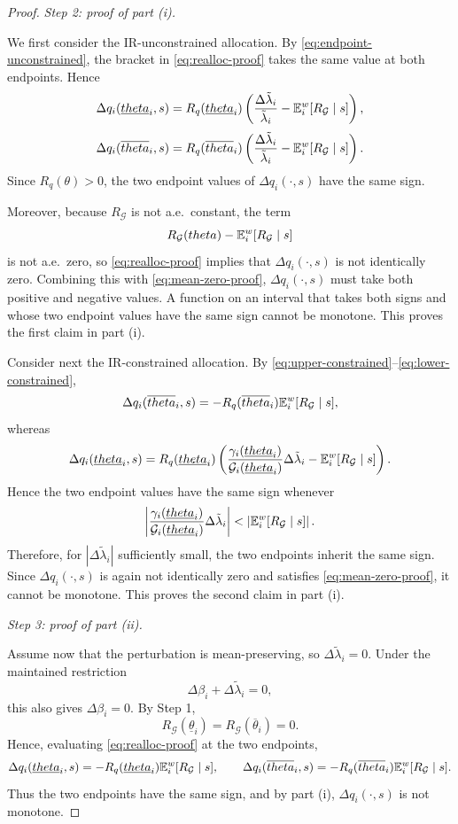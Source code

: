 \documentclass[master.tex]{subfiles}
\begin{document}
\begin{proof}
\noindent\textit{Step 2: proof of part (i).}

We first consider the IR-unconstrained allocation. By \eqref{eq:endpoint-unconstrained}, the bracket in \eqref{eq:realloc-proof} takes the same value at both endpoints. Hence
\[
\Delta q_i(\underline{theta}_i,s)
=
R_q(\underline{theta}_i)
\left(
\frac{\Delta\tilde\lambda_i}{\tilde\lambda_i}
-
\mathbb{E}_i^w[R_{\mathcal G}\mid s]
\right),
\]
\[
\Delta q_i(\overline{theta}_i,s)
=
R_q(\overline{theta}_i)
\left(
\frac{\Delta\tilde\lambda_i}{\tilde\lambda_i}
-
\mathbb{E}_i^w[R_{\mathcal G}\mid s]
\right).
\]
Since $R_q(\theta)>0$, the two endpoint values of $\Delta q_i(\cdot,s)$ have the same sign.

Moreover, because $R_{\mathcal G}$ is not a.e.\ constant, the term
\[
R_{\mathcal G}(theta)-\mathbb{E}_i^w[R_{\mathcal G}\mid s]
\]
is not a.e.\ zero, so \eqref{eq:realloc-proof} implies that $\Delta q_i(\cdot,s)$ is not identically zero. Combining this with \eqref{eq:mean-zero-proof}, $\Delta q_i(\cdot,s)$ must take both positive and negative values. A function on an interval that takes both signs and whose two endpoint values have the same sign cannot be monotone. This proves the first claim in part (i).

Consider next the IR-constrained allocation. By \eqref{eq:upper-constrained}--\eqref{eq:lower-constrained},
\[
\Delta q_i(\overline{theta}_i,s)
=
-
R_q(\overline{theta}_i)\mathbb{E}_i^w[R_{\mathcal G}\mid s],
\]
whereas
\[
\Delta q_i(\underline{theta}_i,s)
=
R_q(\underline{theta}_i)
\left(
\frac{\gamma_i(\underline{theta}_i)}{\mathcal G_i(\underline{theta}_i)}\Delta\tilde\lambda_i
-
\mathbb{E}_i^w[R_{\mathcal G}\mid s]
\right).
\]
Hence the two endpoint values have the same sign whenever
\[
\left|
\frac{\gamma_i(\underline{theta}_i)}{\mathcal G_i(\underline{theta}_i)}
\Delta\tilde\lambda_i
\right|
<
\left|
\mathbb{E}_i^w[R_{\mathcal G}\mid s]
\right|.
\]
Therefore, for $|\Delta\tilde\lambda_i|$ sufficiently small, the two endpoints inherit the same sign. Since $\Delta q_i(\cdot,s)$ is again not identically zero and satisfies \eqref{eq:mean-zero-proof}, it cannot be monotone. This proves the second claim in part (i).


\noindent\textit{Step 3: proof of part (ii).}

Assume now that the perturbation is mean-preserving, so $\Delta\tilde\lambda_i=0$. Under the maintained restriction
\[
\Delta\beta_i+\Delta\tilde\lambda_i=0,
\]
this also gives $\Delta\beta_i=0$. By Step 1,
\[
R_{\mathcal G}(\underline\theta_i)=R_{\mathcal G}(\overline\theta_i)=0.
\]
Hence, evaluating \eqref{eq:realloc-proof} at the two endpoints,
\begin{equation}\label{eq:endpoints-part-ii}
\Delta q_i(\underline{theta}_i,s)
=
-
R_q(\underline{theta}_i)\mathbb{E}_i^w[R_{\mathcal G}\mid s],
\qquad
\Delta q_i(\overline{theta}_i,s)
=
-
R_q(\overline{theta}_i)\mathbb{E}_i^w[R_{\mathcal G}\mid s].
\end{equation}
Thus the two endpoints have the same sign, and by part (i), $\Delta q_i(\cdot,s)$ is not monotone.


\end{proof}
\end{document}
